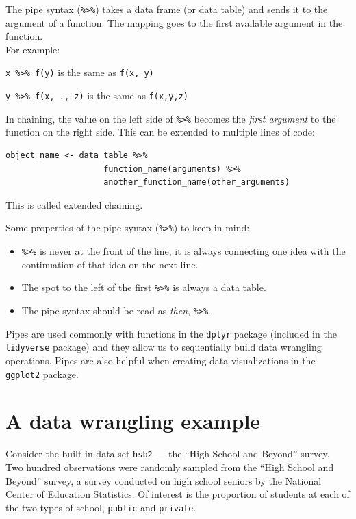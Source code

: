 \documentclass[
  10pt,
  openany]{book}
\theoremstyle{definition}
\theoremstyle{definition}
\theoremstyle{definition}
\theoremstyle{definition}
\theoremstyle{remark}
\begin{document}
The pipe syntax (\texttt{\%\textgreater{}\%}) takes a data frame (or data table) and sends it to the argument of a function. The mapping goes to the first available argument in the function.\\
For example:

\texttt{x\ \%\textgreater{}\%\ f(y)} is the same as \texttt{f(x,\ y)}

\texttt{y\ \%\textgreater{}\%\ f(x,\ .,\ z)} is the same as \texttt{f(x,y,z)}

In chaining, the value on the left side of \texttt{\%\textgreater{}\%} becomes the \emph{first argument} to the function on the right side. This can be extended to multiple lines of code:

\begin{verbatim}
object_name <- data_table %>%
                    function_name(arguments) %>% 
                    another_function_name(other_arguments)
\end{verbatim}

This is called extended chaining.

Some properties of the pipe syntax (\texttt{\%\textgreater{}\%}) to keep in mind:

\begin{itemize}
\item
  \texttt{\%\textgreater{}\%} is never at the front of the line, it is always connecting one idea with the continuation of that idea on the next line.
\item
  The spot to the left of the first \texttt{\%\textgreater{}\%} is always a data table.
\item
  The pipe syntax should be read as \emph{then}, \texttt{\%\textgreater{}\%}.
\end{itemize}

Pipes are used commonly with functions in the \texttt{dplyr} package
(included in the \texttt{tidyverse} package) and they allow us to
sequentially build data wrangling operations.
Pipes are also helpful when creating data visualizations in the \texttt{ggplot2} package.

\section{A data wrangling example}\label{a-data-wrangling-example}

Consider the built-in data set \texttt{hsb2} --- the ``High School and Beyond'' survey.\\
Two hundred observations were randomly sampled from the
``High School and Beyond'' survey, a survey conducted on high
school seniors by the National Center of Education Statistics.
Of interest is the proportion of students at each of the
two types of school, \texttt{public} and \texttt{private}.
\end{document}
